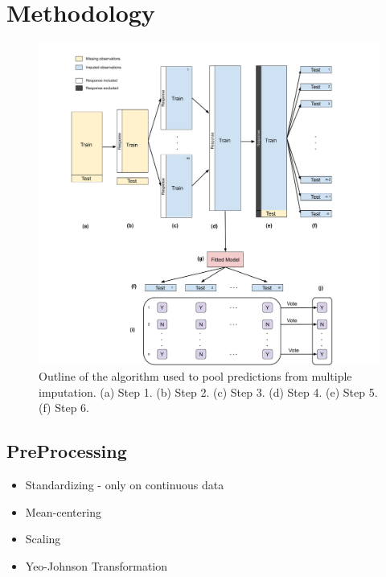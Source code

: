 \documentclass[12pt,]{article}
\providecommand{\tightlist}{%
  \setlength{\itemsep}{0pt}\setlength{\parskip}{0pt}}
\begin{document}
\newpage

\section{Methodology}\label{methodology}

\begin{figure}[H]

{\centering \includegraphics[width=1\linewidth]{images/ensemble-imputation} 

}

\caption{\label{fig:ensemble-imputation}Outline of the algorithm used to pool predictions from multiple imputation.  (a) Step 1. (b) Step 2. (c) Step 3. (d) Step 4.  (e) Step 5.  (f) Step 6.}\label{fig:ensemble-imputation}
\end{figure}

\subsection{PreProcessing}\label{preprocessing}

\begin{itemize}
\tightlist
\item
  Standardizing - only on continuous data
\item
  Mean-centering
\item
  Scaling
\item
  Yeo-Johnson Transformation
\end{itemize}
\end{document}

